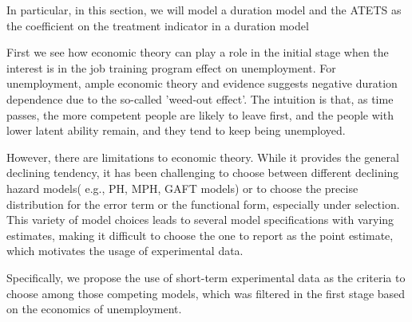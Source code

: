 \documentclass{article}
\begin{document}
In particular, in this section, we will model a duration model and the ATETS as the coefficient on the treatment indicator in a duration model
 
First we see how economic theory can play a role in the initial stage when the interest is in the job training program effect on unemployment.
      For unemployment, ample economic theory and evidence suggests negative duration dependence due to the so-called 'weed-out effect'. The intuition is that, as time passes, the more competent people are likely to leave first, and the people with lower latent ability remain, and they tend to keep being unemployed.
      
         However, there are limitations to economic theory. While it provides the general declining tendency, it has been challenging to choose between different declining hazard models( e.g., PH, MPH, GAFT models) or to choose the precise distribution for the error term or the functional form, especially under selection. This variety of model choices leads to several model specifications with varying estimates, making it difficult to choose the one to report as the point estimate, which motivates the usage of experimental data.
         
             Specifically, we propose the use of short-term experimental data as the criteria to choose among those competing models, which was filtered in the first stage based on the economics of unemployment.
             
\end{document}
